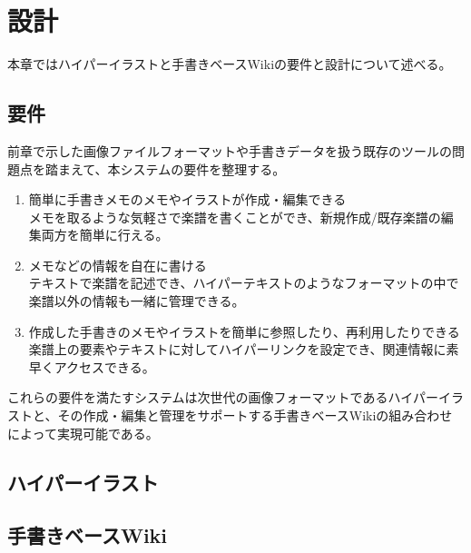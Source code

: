 \chapter{設計}
\label{chap:sekkei}

本章ではハイパーイラストと手書きベースWikiの要件と設計について述べる。

\newpage

\section{要件}
前章で示した画像ファイルフォーマットや手書きデータを扱う既存のツールの問題点を踏まえて、本システムの要件を整理する。
\begin{enumerate}
    \item 簡単に手書きメモのメモやイラストが作成・編集できる\\
    メモを取るような気軽さで楽譜を書くことができ、新規作成/既存楽譜の編集両方を簡単に行える。
    \item メモなどの情報を自在に書ける\\
    テキストで楽譜を記述でき、ハイパーテキストのようなフォーマットの中で楽譜以外の情報も一緒に管理できる。
    \item 作成した手書きのメモやイラストを簡単に参照したり、再利用したりできる\\
    楽譜上の要素やテキストに対してハイパーリンクを設定でき、関連情報に素早くアクセスできる。
\end{enumerate}
これらの要件を満たすシステムは次世代の画像フォーマットであるハイパーイラストと、その作成・編集と管理をサポートする手書きベースWikiの組み合わせによって実現可能である。

\section{ハイパーイラスト}


\section{手書きベースWiki}
